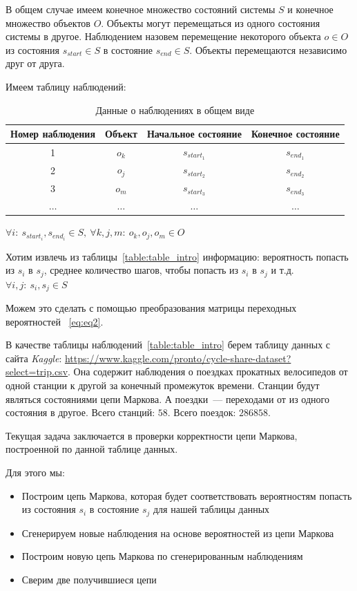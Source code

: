 \documentclass[specialist, substylefile = spbu_report.rtx, subf,href,colorlinks=true, 12pt]{disser}
\begin{document}
В общем случае имеем конечное множество состояний системы $S$ и конечное множество объектов $O$. Объекты могут перемещаться из одного состояния системы в другое. Наблюдением назовем перемещение некоторого объекта $o \in O$ из состояния $s_{start} \in S$ в состояние $s_{end} \in S$. Объекты перемещаются независимо друг от друга.

Имеем таблицу наблюдений:

\begin{table}[h]
	\begin{center}
		\begin{tabular}{|c|c|c|c|}
			\hline
			Номер наблюдения & 		Объект &	Начальное состояние		& Конечное состояние \\ \hline
			1 & $o_k$ & $s_{start_{1}}$ & $s_{end_{1}}$ \\ \hline
			2 & $o_j$ & $s_{start_{2}}$ & $s_{end_{2}}$ \\ \hline
			3 & $o_m$ & $s_{start_{3}}$ & $s_{end_{3}}$ \\ \hline
			$\ldots$ & $\ldots$  & $\ldots$ & $\ldots$ 
		\end{tabular}
	\end{center}
	\caption{Данные о наблюдениях в общем виде}\label{table:table_intro}
\end{table}
$\forall i: \ s_{start_{i}}, s_{end_{i}} \in S, \ \forall k, j, m: \ o_k, o_j,o_m \in O$

Хотим извлечь из таблицы~\eqref{table:table_intro} информацию: вероятность попасть из $s_{i}$ в $s_{j}$, среднее количество шагов, чтобы попасть из $s_{i}$ в $s_{j}$ и т.д. $\forall i, j: \ s_i,s_j \in S$

Можем это сделать с помощью преобразования матрицы переходных вероятностей ~\eqref{eq:eq2}.

В качестве таблицы наблюдений~\eqref{table:table_intro} берем таблицу данных с сайта \textit{Kaggle}: \url{https://www.kaggle.com/pronto/cycle-share-dataset?select=trip.csv}. Она содержит наблюдения о поездках прокатных велосипедов от одной станции к другой за конечный промежуток времени. Станции будут являться состояниями цепи Маркова. А поездки~--- переходами от из одного состояния в другое. Всего станций: $58$. Всего поездок: $286858$.

Текущая задача заключается в проверки корректности цепи Маркова, построенной по данной таблице данных.

Для этого мы:
\begin{itemize}
	\item Построим цепь Маркова, которая будет соответствовать вероятностям попасть из состояния $s_i$ в состояние $s_j$ для нашей таблицы данных
	\item Сгенерируем новые наблюдения на основе вероятностей из цепи Маркова
	\item Построим новую цепь Маркова по сгенерированным наблюдениям
	\item Сверим две получившиеся цепи
\end{itemize}
\end{document}
